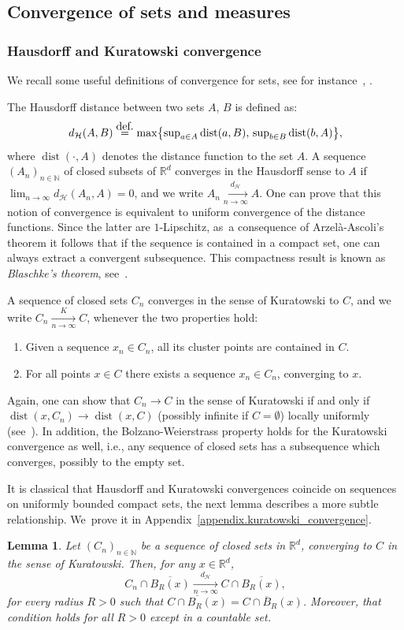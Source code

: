 \documentclass[11pt]{article}
\newcommand{\ie}{i.e.,\xspace}
\newcommand{\Subsection}{\subsection}
\numberwithin{equation}{section}
\let\ts\textstyle
\newtheorem{lemma}[theorem]{Lemma}
\theoremstyle{definition}
\newcommand{\eqdef}{\ensuremath{\stackrel{\mbox{\upshape\tiny def.}}{=}}}
\newcommand{\RR}{\mathbb{R}}
\DeclareMathOperator{\dist}{dist}
\newcommand{\distH}{d_{\mathcal{H}}}
\begin{document}
\Subsection{Convergence of sets and measures}

\subsubsection{Hausdorff and Kuratowski convergence}\label{subsection.Hausdorff_Kuratoski}
We recall some useful definitions of convergence for sets, see for instance~\cite[Chap.\,4]{rockafellar2009variational}, \cite[Chap.\,6]{ambrosio2000functions}.

The Hausdorff distance between two sets $A$, $B$ is defined
as:
\begin{equation}
\label{hausdorff.distance}
\distH(A,B) \eqdef \max\bigl\{\ts
\sup_{a \in A} \dist(a, B),\, \sup_{b \in B} \dist(b, A)
\bigr\},
\end{equation}
where $\dist(\cdot, A)$ denotes the distance function to the set $A$.
A sequence $\left(A_n\right)_{n \in \mathbb{N}}$ of closed subsets of $\RR^d$ converges in the Hausdorff sense to $A$ if $\lim_{n\to\infty} \distH(A_n, A)=0$, and we write $A_n \xrightarrow[n \to \infty]{\distH} A$.
One can prove that this notion of convergence is equivalent to uniform convergence of the distance functions. Since the latter are $1$-Lipschitz, as~a consequence of Arzelà-Ascoli's theorem it follows that if the sequence is contained in a compact set, one can always extract a convergent subsequence. This compactness result is known as \emph{Blaschke's theorem}, see~\cite[Th.\,6.1]{ambrosio2000functions}.

A sequence of closed sets $C_n$ converges in the sense of Kuratowski to $C$, and we write $C_n \xrightarrow[n \to \infty]{K} C$, whenever the two properties hold:
\begin{enumerate}
\item Given a sequence $x_n \in C_n$, all its cluster points are contained in $C$.
\item For all points $x\in C$ there exists a sequence $x_n \in C_n$, converging to $x$.
\end{enumerate}
Again, one can show that $C_n\to C$ in the sense of Kuratowski
if and only if $\dist(x,C_n)\to\dist(x,C)$ (possibly infinite if $C=\emptyset$) locally uniformly (see~\cite[Cor.\,4.7]{rockafellar2009variational}). In addition, the Bolzano-Weierstrass property holds for the Kuratowski convergence as well, \ie any sequence of closed sets has a subsequence which converges, possibly to the empty set.

It is classical that Hausdorff and Kuratowski convergences coincide on sequences on uniformly bounded compact sets, the next lemma describes a more subtle relationship. We~prove it in Appendix~\ref{appendix.kuratowski_convergence}.
\begin{lemma}\label{lemma.localized_Kuratowski}
Let $(C_n)_{n \in \mathbb{N}}$ be a sequence of closed sets in $\RR^d$, converging to $C$ in the sense of Kuratowski.
Then, for any $x \in \RR^d$,
\[
C_n\cap\overline{B_R(x)}
\xrightarrow[n \to \infty]{\distH}
C\cap\overline{B_R(x)},
\]
for every radius $R>0$ such that $\overline{C\cap B_R(x)} = C\cap \overline{B}_R(x)$. Moreover, that condition holds for all $R>0$ except in a countable set.
\end{lemma}
\end{document}
